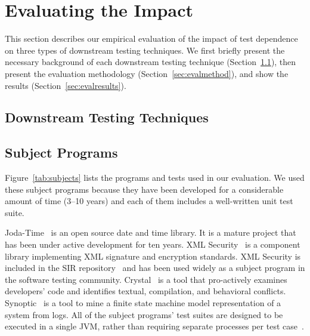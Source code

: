 \section{Evaluating the Impact}

\newcommand{\jt}{Joda-Time\xspace}

\newcommand{\jfreecharttests}{2234\xspace}%
\newcommand{\jodatimetests}{3875\xspace}
\newcommand{\xmlsecuritytests}{108\xspace}
\newcommand{\crystaltests}{75\xspace}
\newcommand{\synoptictests}{118\xspace}
\newcommand{\totaltests}{4176\xspace}

\newcommand{\jfreechartautotests}{2946\xspace}
\newcommand{\jodatimeautotests}{2639\xspace}
\newcommand{\xmlsecurityautotests}{665\xspace}
\newcommand{\crystalautotests}{3198\xspace}
\newcommand{\synopticautotests}{2467\xspace}
\newcommand{\totalautotests}{8969\xspace}

\label{sec:impact}

This section describes our empirical evaluation of
the impact of test dependence on three types of
downstream testing techniques.
We first briefly present the necessary background of
each downstream testing technique (Section~\ref{sec:evalbackground}), then
present the evaluation methodology (Section~\ref{sec:evalmethod}), and
show the results (Section~\ref{sec:evalresults}).


\subsection{Downstream Testing Techniques}
\label{sec:evalbackground}


\subsection{Subject Programs}
\label{sec:subj}

Figure~\ref{tab:subjects} lists the programs and
tests used in our evaluation. We used these subject
programs because they have been developed for
a considerable amount of time (3--10 years) and each
of them includes a well-written unit test suite.

\jt~\cite{jodatime} is an open source
date and time library. It is a mature project that
has been under active development
for ten years. XML Security~\cite{xmlsecurity}
is a component library implementing XML signature and encryption
standards. XML Security is included in
the SIR repository~\cite{sir} and has been used widely
as a subject program in the software testing community.
Crystal~\cite{crystal} is a tool that
pro-actively examines developers' code and
identifies textual, compilation, and behavioral conflicts.
Synoptic~\cite{synoptic} is a tool to mine a finite state
machine model representation of a system from logs.
All of the subject programs' test suites are designed to be executed in
a single JVM, rather than requiring separate processes per test case~\cite{vmvm}.

